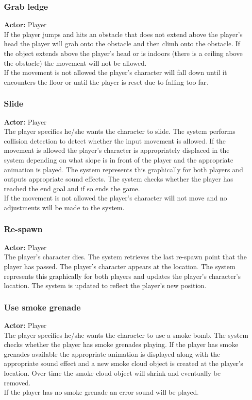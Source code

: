 \documentclass[11pt,a4paper]{article}
\begin{document}
\subsubsection{Grab ledge}
\textbf{Actor:} Player\smallskip\\
If the player jumps and hits an obstacle that does not extend above the player's head the player will grab onto the obstacle and then climb onto the obstacle. If the object extends above the player's head or is indoors (there is a ceiling above the obstacle) the movement will not be allowed.\smallskip\\
If the movement is not allowed the player's character will fall down until it encounters the floor or until the player is reset due to falling too far.

\subsubsection{Slide}
\textbf{Actor:} Player\smallskip\\
The player specifies he/she wants the character to slide. The system performs collision detection to detect whether the input movement is allowed. If the movement is allowed the player's character is appropriately displaced in the system depending on what slope is in front of the player and the appropriate animation is played. The system represents this graphically for both players and outputs appropriate sound effects. The system checks whether the player has reached the end goal and if so ends the game.\smallskip\\
If the movement is not allowed the player's character will not move and no adjustments will be made to the system.

\subsubsection{Re-spawn}
\textbf{Actor:} Player\smallskip\\
The player's character dies. The system retrieves the last re-spawn point that the player has passed. The player's character appears at the location. The system represents this graphically for both players and updates the player's character's location.  The system is updated to reflect the player's new position.\smallskip\\

\subsubsection{Use smoke grenade}
\textbf{Actor:} Player\smallskip\\
The player specifies he/she wants the character to use a smoke bomb. The system checks whether the player has smoke grenades playing. If the player has smoke grenades available the appropriate animation is displayed along with the appropriate sound effect and a new smoke cloud object is created at the player's location. Over time the smoke cloud object will shrink and eventually be removed.\smallskip\\
If the player has no smoke grenade an error sound will be played.
\end{document}
